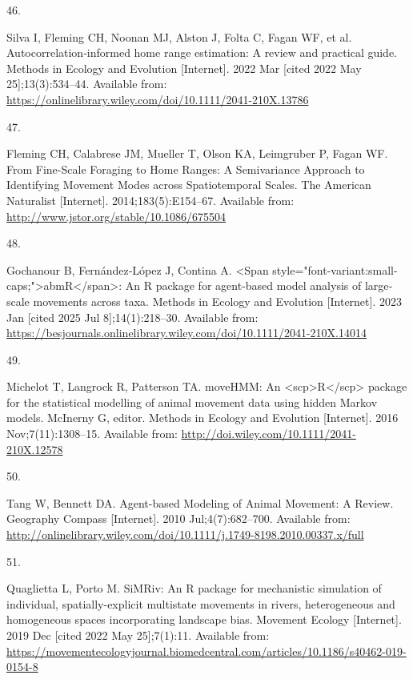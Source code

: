 \documentclass[10pt,a4paper]{article}
\newlength{\cslhangindent}
\newlength{\csllabelwidth}
\newenvironment{CSLReferences}[2] %
{\begin{list}{}{%
	\setlength{\itemindent}{0pt}
	\setlength{\leftmargin}{0pt}
	\setlength{\parsep}{0pt}
	\ifodd #1
	\setlength{\leftmargin}{\cslhangindent}
	\setlength{\itemindent}{-1\cslhangindent}
	\fi
	\setlength{\itemsep}{#2\baselineskip}}}
{\end{list}}
\newcommand{\CSLLeftMargin}[1]{\parbox[t]{\csllabelwidth}{\strut#1\strut}}
\newcommand{\CSLRightInline}[1]{\parbox[t]{\linewidth - \csllabelwidth}{\strut#1\strut}}
\begin{document}
\begin{CSLReferences}{0}{1}
\CSLLeftMargin{46. }%
\CSLRightInline{Silva I, Fleming CH, Noonan MJ, Alston J, Folta C, Fagan WF, et al. Autocorrelation‐informed home range estimation: {A} review and practical guide. Methods in Ecology and Evolution {[}Internet{]}. 2022 Mar {[}cited 2022 May 25{]};13(3):534--44. Available from: \url{https://onlinelibrary.wiley.com/doi/10.1111/2041-210X.13786}}

\CSLLeftMargin{47. }%
\CSLRightInline{Fleming CH, Calabrese JM, Mueller T, Olson KA, Leimgruber P, Fagan WF. From {Fine}-{Scale} {Foraging} to {Home} {Ranges}: {A} {Semivariance} {Approach} to {Identifying} {Movement} {Modes} across {Spatiotemporal} {Scales}. The American Naturalist {[}Internet{]}. 2014;183(5):E154--67. Available from: \url{http://www.jstor.org/stable/10.1086/675504}}

\CSLLeftMargin{48. }%
\CSLRightInline{Gochanour B, Fernández‐López J, Contina A. {\textless{}}Span style="font-variant:small-caps;"{\textgreater{}}{abmR}{\textless{}}/span{\textgreater{}}: {An} {R} package for agent‐based model analysis of large‐scale movements across taxa. Methods in Ecology and Evolution {[}Internet{]}. 2023 Jan {[}cited 2025 Jul 8{]};14(1):218--30. Available from: \url{https://besjournals.onlinelibrary.wiley.com/doi/10.1111/2041-210X.14014}}

\CSLLeftMargin{49. }%
\CSLRightInline{Michelot T, Langrock R, Patterson TA. {moveHMM}: An {\textless{}}scp{\textgreater{}}{R}{\textless{}}/scp{\textgreater{}} package for the statistical modelling of animal movement data using hidden {Markov} models. McInerny G, editor. Methods in Ecology and Evolution {[}Internet{]}. 2016 Nov;7(11):1308--15. Available from: \url{http://doi.wiley.com/10.1111/2041-210X.12578}}

\CSLLeftMargin{50. }%
\CSLRightInline{Tang W, Bennett DA. Agent-based {Modeling} of {Animal} {Movement}: {A} {Review}. Geography Compass {[}Internet{]}. 2010 Jul;4(7):682--700. Available from: \url{http://onlinelibrary.wiley.com/doi/10.1111/j.1749-8198.2010.00337.x/full}}

\CSLLeftMargin{51. }%
\CSLRightInline{Quaglietta L, Porto M. {SiMRiv}: An {R} package for mechanistic simulation of individual, spatially-explicit multistate movements in rivers, heterogeneous and homogeneous spaces incorporating landscape bias. Movement Ecology {[}Internet{]}. 2019 Dec {[}cited 2022 May 25{]};7(1):11. Available from: \url{https://movementecologyjournal.biomedcentral.com/articles/10.1186/s40462-019-0154-8}}


\end{CSLReferences}
\end{document}
